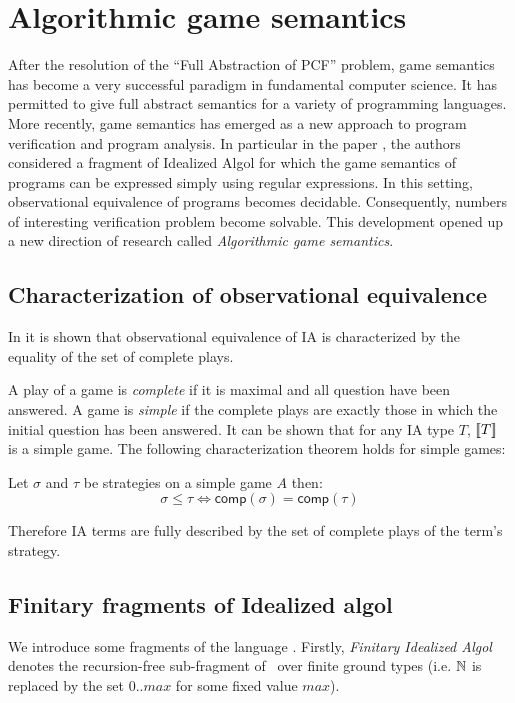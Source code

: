 \section{Algorithmic game semantics}

After the resolution of the ``Full Abstraction of PCF'' problem,
game semantics has become a very successful paradigm in fundamental
computer science. It has permitted to give full abstract semantics
for a variety of programming languages. More recently, game
semantics has emerged as a new approach to program verification and
program analysis. In particular in the paper \cite{ghicamccusker00},
the authors considered a fragment of Idealized Algol for which the
game semantics of programs can be expressed simply using regular
expressions. In this setting, observational equivalence of programs
becomes decidable. Consequently, numbers of interesting verification
problem become solvable. This development opened up a new direction
of research called \emph{Algorithmic game semantics}.

\subsection{Characterization of observational equivalence}

In \citep{AM97a} it is shown that observational equivalence of IA is
characterized by the equality of the set of complete plays.

A play of a game is \emph{complete} if it is maximal and all
question have been answered. A game is \emph{simple} if the complete
plays are exactly those in which the initial question has been
answered. It can be shown that for any IA type $T$, ${[\![ T ]\!]}$ is a
simple game. The following characterization theorem holds for simple
games:
\begin{thm}
Let $\sigma$ and $\tau$ be strategies on a simple game $A$ then:
$$\sigma \leq \tau \iff \textsf{comp}(\sigma) = \textsf{comp}(\tau)$$
\end{thm}
Therefore IA terms are fully described by the set of complete plays of
the term's strategy.

\subsection{Finitary fragments of Idealized algol}
We introduce
some fragments of the language \ialgol. Firstly, \emph{Finitary
Idealized Algol} denotes the recursion-free sub-fragment of \ialgol\
over finite ground types (i.e. $\mathbb{N}$ is replaced by the set $0..max$ for some
fixed value $max$).

